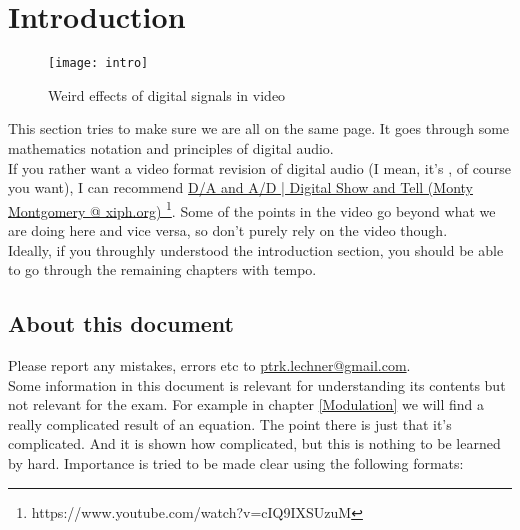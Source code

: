 
\chapter{Introduction}
\label{introduction}

\begin{figure}[h!]
	\centering
	\texttt{[image: intro]}
	\caption[shortCaption]
	{Weird effects of digital signals in video}
	\label{fig:label}
\end{figure}
\clearpage

This section tries to make sure we are all on the same page. It goes through some mathematics notation and principles of digital audio.\\
If you rather want a video format revision of digital audio (I mean, it's \the\year, of course you want), I can recommend \href{https://www.youtube.com/watch?v=cIQ9IXSUzuM}{D/A and A/D | Digital Show and Tell (Monty Montgomery @ xiph.org) }\footnote{https://www.youtube.com/watch?v=cIQ9IXSUzuM}. Some of the points in the video go beyond what we are doing here and vice versa, so don't purely rely on the video though. \\
Ideally, if you throughly understood the introduction section, you should be able to go through the remaining chapters with tempo.\\

\section{About this document}
Please report any mistakes, errors etc to \href{mailto:ptrk.lechner@gmail.com}{ptrk.lechner@gmail.com}.\\

Some information in this document is relevant for understanding its contents but not relevant for the exam. For example in chapter \ref{Modulation} we will find a really complicated result of an equation. The point there is just that it's complicated. And it is shown how complicated, but this is nothing to be learned by hard. Importance is tried to be made clear using the following formats:\\



